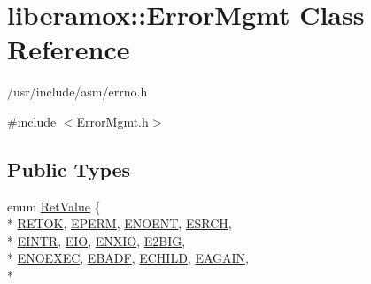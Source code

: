 \hypertarget{classliberamox_1_1ErrorMgmt}{}\section{liberamox\+:\+:Error\+Mgmt Class Reference}
\label{classliberamox_1_1ErrorMgmt}


/usr/include/asm/errno.h  




{\ttfamily \#include $<$Error\+Mgmt.\+h$>$}

\subsection*{Public Types}
\begin{DoxyCompactItemize}
\item 
enum \hyperlink{classliberamox_1_1ErrorMgmt_a5e39af0b825ab9130a1734e79200e2b6}{Ret\+Value} \{ \\*
\hyperlink{classliberamox_1_1ErrorMgmt_a5e39af0b825ab9130a1734e79200e2b6a2b6e9e58ae235205dd8a631218846e42}{R\+E\+T\+OK}, 
\hyperlink{classliberamox_1_1ErrorMgmt_a5e39af0b825ab9130a1734e79200e2b6ab0f3ee4b1c62cabe7995e58301ef7f7c}{E\+P\+E\+RM}, 
\hyperlink{classliberamox_1_1ErrorMgmt_a5e39af0b825ab9130a1734e79200e2b6a7c7e8e1c8b5a52acbd2fdd47a584bf33}{E\+N\+O\+E\+NT}, 
\hyperlink{classliberamox_1_1ErrorMgmt_a5e39af0b825ab9130a1734e79200e2b6a6ae3eb51a6b9a3f16ef376278ed290b2}{E\+S\+R\+CH}, 
\\*
\hyperlink{classliberamox_1_1ErrorMgmt_a5e39af0b825ab9130a1734e79200e2b6af344b6bd31640a3484756995763b0c33}{E\+I\+N\+TR}, 
\hyperlink{classliberamox_1_1ErrorMgmt_a5e39af0b825ab9130a1734e79200e2b6a13e79a9dac976d1279fae0a8bdea067c}{E\+IO}, 
\hyperlink{classliberamox_1_1ErrorMgmt_a5e39af0b825ab9130a1734e79200e2b6a8422e9d953c665ab3e6c97dc9d49b6b8}{E\+N\+X\+IO}, 
\hyperlink{classliberamox_1_1ErrorMgmt_a5e39af0b825ab9130a1734e79200e2b6a1e4b912a780e92f676f86a1dd2037433}{E2\+B\+IG}, 
\\*
\hyperlink{classliberamox_1_1ErrorMgmt_a5e39af0b825ab9130a1734e79200e2b6aa0b80339a681751c2d85c3c528107c32}{E\+N\+O\+E\+X\+EC}, 
\hyperlink{classliberamox_1_1ErrorMgmt_a5e39af0b825ab9130a1734e79200e2b6a0c3ed40e5e7c2c617b13334d16f9726a}{E\+B\+A\+DF}, 
\hyperlink{classliberamox_1_1ErrorMgmt_a5e39af0b825ab9130a1734e79200e2b6a50b9f1fcd48a5bd74576676755c313d7}{E\+C\+H\+I\+LD}, 
\hyperlink{classliberamox_1_1ErrorMgmt_a5e39af0b825ab9130a1734e79200e2b6ae7da30e8b546a8608ddcbddffe1c7657}{E\+A\+G\+A\+IN}, 
\\*

\end{DoxyCompactItemize}
